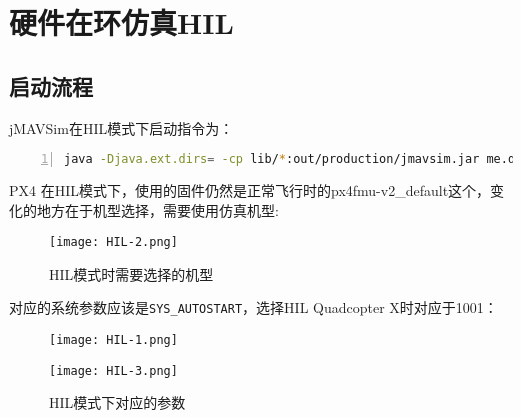 \section{硬件在环仿真HIL}
\subsection{启动流程}
jMAVSim在HIL模式下启动指令为：
\begin{lstlisting}[language=sh,numbers=left,firstnumber = 1,breaklines = true,numberstyle=\tiny,keywordstyle=\color{blue!70},commentstyle=\color{red!50!green!50!blue!50},frame=shadowbox, rulesepcolor=\color{red!20!green!20!blue!20}]
java -Djava.ext.dirs= -cp lib/*:out/production/jmavsim.jar me.drton.jmavsim.Simulator -serial /dev/ttyACM0 921600 -qgc
\end{lstlisting}

PX4 在HIL模式下，使用的固件仍然是正常飞行时的px4fmu-v2_default这个，变化的地方在于机型选择，需要使用仿真机型:
\begin{figure}[htbp]
	\figskip
	\centering
	\texttt{[image: HIL-2.png]}	  
	\caption{\label{fig: HIL2} HIL模式时需要选择的机型}
\end{figure}
对应的系统参数应该是\texttt{SYS_AUTOSTART}，选择HIL Quadcopter X时对应于1001：
\begin{figure}[htbp]
	\begin{minipage}[t]{0.5\textwidth}
	\centering
	\texttt{[image: HIL-1.png]}
	\caption{\label{fig:HIL1}HIL模式下的机型}
	\end{minipage}
	\begin{minipage}[t]{0.5\textwidth}
	\centering
	\texttt{[image: HIL-3.png]}
	\caption{\label{fig:HIL3}HIL模式下对应的参数}
	\end{minipage}
\end{figure}

